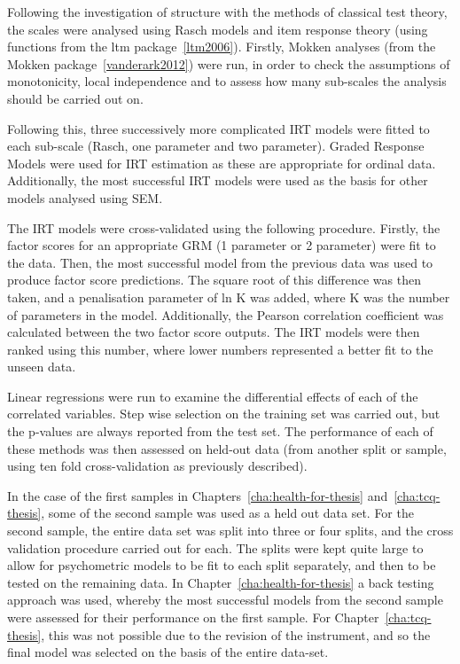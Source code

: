Following the investigation of structure with the methods of classical test theory, the scales were analysed using Rasch models and item response theory (using functions from the ltm package~\ref{ltm2006}). Firstly, Mokken analyses (from the Mokken package~\ref{vanderark2012}) were run, in order to check the assumptions of monotonicity, local independence and to assess how many sub-scales the analysis should be carried out on. 

Following this, three successively more complicated IRT models were fitted to each sub-scale (Rasch, one parameter and two parameter). Graded Response Models were used for IRT estimation as these are appropriate for ordinal data. Additionally, the most successful IRT models were used as the basis for other models analysed using SEM. 

The IRT models were cross-validated using the following procedure. Firstly, the factor scores for an appropriate GRM (1 parameter or 2 parameter) were fit to the data. Then, the most successful model from the previous data was used to produce factor score predictions. The square root of this difference was then taken, and a penalisation parameter of ln K was added, where K was the number of parameters in the model. Additionally, the Pearson correlation coefficient was calculated between the two factor score outputs. The IRT models were then ranked using this number, where lower numbers represented a better fit to the unseen data. 


Linear regressions were run to examine the differential effects of each of the correlated variables. Step wise selection on the training set was carried out, but the p-values are always reported from the test set. The performance of each of these methods was then assessed on held-out data (from another split or sample, using ten fold cross-validation as previously described). 

In the case of the first samples in Chapters~\ref{cha:health-for-thesis} and~\ref{cha:tcq-thesis}, some of the second sample was used as a held out data set. For the second sample, the entire data set was split into three or four splits, and the cross validation procedure carried out for each. The splits were kept quite large  to allow for psychometric models to be fit to each split separately, and then to be tested on the remaining data. In Chapter~\ref{cha:health-for-thesis} a back testing approach was used, whereby the most successful models from the second sample were assessed for their performance on the first sample. For Chapter~\ref{cha:tcq-thesis}, this was not possible due to the revision of the instrument, and so the final model was selected on the basis of the entire data-set. 


